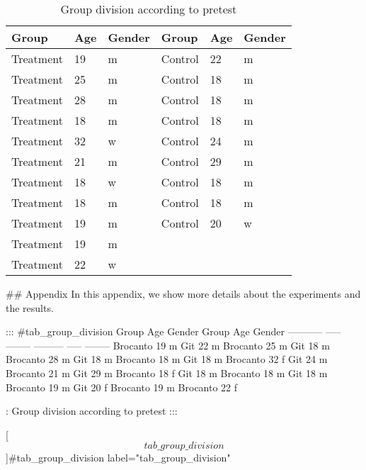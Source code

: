\begin{table}
    \caption{Group division according to pretest}
    \centering
    \begin{tabular}{lll|lll}
    \toprule
    Group     & Age & Gender & Group & Age & Gender  \\
    \midrule
    Treatment & 19  & m              & Control & 22 & m  \\
    Treatment & 25  & m              & Control & 18 & m  \\
    Treatment & 28  & m              & Control & 18 & m  \\
    Treatment & 18  & m              & Control & 18 & m  \\
    Treatment & 32  & w              & Control & 24 & m  \\
    Treatment & 21  & m              & Control & 29 & m  \\
    Treatment & 18  & w              & Control & 18 & m  \\
    Treatment & 18  & m              & Control & 18 & m  \\
    Treatment & 19  & m              & Control & 20 & w  \\
    Treatment & 19  & m              \\
    Treatment & 22  & w              \\
    \bottomrule
    \end{tabular}
    \label{tab_group_division}
    \end{table}




## Appendix
In this appendix, we show more details about the experiments and the results.

::: {#tab_group_division}
Group       Age   Gender   Group     Age   Gender
  ----------- ----- -------- --------- ----- --------
Brocanto    19    m        Git       22    m
Brocanto    25    m        Git       18    m
Brocanto    28    m        Git       18    m
Brocanto    18    m        Git       18    m
Brocanto    32    f        Git       24    m
Brocanto    21    m        Git       29    m
Brocanto    18    f        Git       18    m
Brocanto    18    m        Git       18    m
Brocanto    19    m        Git       20    f
Brocanto    19    m
Brocanto    22    f

: Group division according to pretest
:::

[\[tab\_group\_division\]]{#tab_group_division
label="tab_group_division"}
